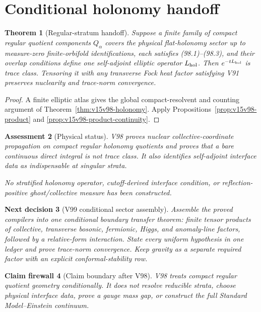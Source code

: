 \documentclass[11pt]{article}
\newtheorem{theorem}{Theorem}[section]
\newtheorem{firewall}[theorem]{Claim firewall}
\newtheorem{decision}[theorem]{Next decision}
\newtheorem{assessment}[theorem]{Assessment}
\theoremstyle{remark}
\begin{document}
\section{Conditional holonomy handoff}

\begin{theorem}[Regular-stratum handoff]
\label{thm:v15v98-handoff}
Suppose a finite family of compact regular quotient components
\(Q_\alpha\) covers the physical flat-holonomy sector up to
measure-zero finite-orbifold identifications, each satisfies
(98.1)--(98.3), and their overlap conditions define one
self-adjoint elliptic operator \(L_{\rm hol}\).  Then
\(e^{-tL_{\rm hol}}\) is trace class.  Tensoring it with any
transverse Fock heat factor satisfying V91 preserves nuclearity and
trace-norm convergence.
\end{theorem}

\begin{proof}
A finite elliptic atlas gives the global compact-resolvent and
counting argument of Theorem~\ref{thm:v15v98-holonomy}.  Apply
Propositions~\ref{prop:v15v98-product} and
\ref{prop:v15v98-product-continuity}.
\end{proof}

\begin{assessment}[Physical status]
\label{ass:v15v98-status}
V98 proves nuclear collective-coordinate propagation on compact
regular holonomy quotients and proves that a bare continuous direct
integral is not trace class.  It also identifies self-adjoint
interface data as indispensable at singular strata.

No stratified holonomy operator, cutoff-derived interface condition,
or reflection-positive ghost/collective measure has been
constructed.
\end{assessment}

\begin{decision}[V99 conditional sector assembly]
\label{dec:v15v98-next}
Assemble the proved compilers into one conditional boundary transfer
theorem: finite tensor products of collective, transverse bosonic,
fermionic, Higgs, and anomaly-line factors, followed by a
relative-form interaction.  State every uniform hypothesis in one
ledger and prove trace-norm convergence.  Keep gravity as a
separate required factor with an explicit conformal-stability row.
\end{decision}

\begin{firewall}[Claim boundary after V98]
\label{fire:v15v98}
V98 treats compact regular quotient geometry conditionally.  It
does not resolve reducible strata, choose physical interface data,
prove a gauge mass gap, or construct the full Standard
Model--Einstein continuum.
\end{firewall}
\end{document}
